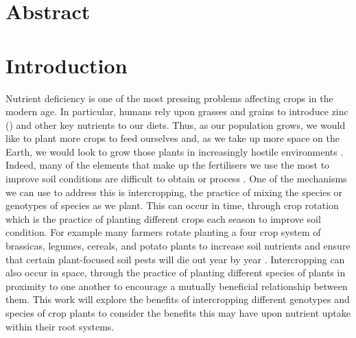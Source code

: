 \documentclass[11pt]{article}
\numberwithin{equation}{section}
\begin{document}
\newpage
\section*{Abstract}
\newpage
\doublespacing
\tableofcontents

\singlespacing
\newpage
{}
\setcounter{page}{1}




\section{Introduction}

Nutrient deficiency is one of the most pressing problems affecting crops in the modern age. In particular, humans rely upon grasses and grains to introduce zinc () and other key nutrients to our diets. Thus, as our population grows, we would like to plant more crops to feed ourselves and, as we take up more space on the Earth, we would look to grow those plants in increasingly hostile environments \cite{calicioglu_2019}. Indeed,  many of the elements that make up the fertilisers we use the most to improve soil conditions are difficult to obtain or process \cite{fact.mr_2021}. One of the mechanisms we can use to address this is intercropping, the practice of mixing the species or genotypes of species as we plant. This can occur in time, through crop rotation which is the practice of planting different crops each season to improve soil condition. For example many farmers rotate planting a four crop system of brassicas, legumes, cereals, and potato plants to increase soil nutrients and ensure that certain plant-focused soil pests will die out year by year \cite{xuan_2011}. Intercropping can also occur in space, through the practice of planting different species of plants in proximity to one another to encourage a mutually beneficial relationship between them. This work will explore the benefits of intercropping different genotypes and species of crop plants to consider the benefits this may have upon nutrient uptake within their root systems.
\end{document}
